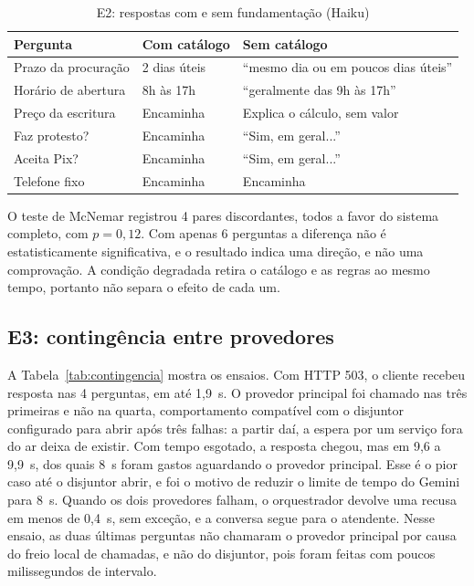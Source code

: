 \documentclass[conference]{IEEEtran}
\begin{document}
\begin{table}[t]
\caption{E2: respostas com e sem fundamentação (Haiku)}
\label{tab:ablacao}
\centering
\footnotesize
\setlength{\tabcolsep}{3pt}
\begin{tabular}{@{}L{2.1cm}L{2.2cm}L{3.3cm}@{}}
\toprule
\textbf{Pergunta} & \textbf{Com catálogo} & \textbf{Sem catálogo} \\
\midrule
Prazo da procuração & 2 dias úteis & ``mesmo dia ou em poucos dias úteis'' \\
Horário de abertura & 8h às 17h & ``geralmente das 9h às 17h'' \\
Preço da escritura & Encaminha & Explica o cálculo, sem valor \\
Faz protesto? & Encaminha & ``Sim, em geral...'' \\
Aceita Pix? & Encaminha & ``Sim, em geral...'' \\
Telefone fixo & Encaminha & Encaminha \\
\bottomrule
\end{tabular}
\end{table}

O teste de McNemar registrou 4 pares discordantes, todos a favor do sistema completo, com $p=0{,}12$. Com apenas 6 perguntas a diferença não é estatisticamente significativa, e o resultado indica uma direção, e não uma comprovação. A condição degradada retira o catálogo e as regras ao mesmo tempo, portanto não separa o efeito de cada um.

\subsection{E3: contingência entre provedores}

A Tabela~\ref{tab:contingencia} mostra os ensaios. Com HTTP 503, o cliente recebeu resposta nas 4 perguntas, em até 1,9~s. O provedor principal foi chamado nas três primeiras e não na quarta, comportamento compatível com o disjuntor configurado para abrir após três falhas: a partir daí, a espera por um serviço fora do ar deixa de existir. Com tempo esgotado, a resposta chegou, mas em 9,6 a 9,9~s, dos quais 8~s foram gastos aguardando o provedor principal. Esse é o pior caso até o disjuntor abrir, e foi o motivo de reduzir o limite de tempo do Gemini para 8~s. Quando os dois provedores falham, o orquestrador devolve uma recusa em menos de 0,4~s, sem exceção, e a conversa segue para o atendente. Nesse ensaio, as duas últimas perguntas não chamaram o provedor principal por causa do freio local de chamadas, e não do disjuntor, pois foram feitas com poucos milissegundos de intervalo.
\end{document}
